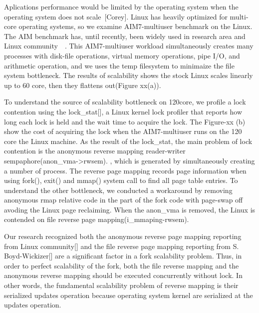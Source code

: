 Aplications performance would be limited by the operating system when the
operating system does not scale~\cite{Clements15SCR}[Corey].
Linux has heavily optimized for multi-core operating systems, so we examine
AIM7-multiuser benchmark on the Linux.
The AIM benchmark has, until recently, been widely used in research area
and Linux community~\cite{Bueso2015STP}~\cite{Bueso2014MCS}.
This AIM7-multiuser workload simultaneously creates many processes with
disk-file operations, virtual memory operations, pipe I/O, and arithmetic
operation, and we uses the temp filesystem to minimaize the file system
bottleneck.
The results of scalability shows the stock Linux scales linearly up to 60 core,
then they flattens out(Figure xx(a)).


To understand the source of scalability bottleneck on 120core, we profile a lock
contention using the lock\_stat[], a Linux kernel lock profiler that reports how
long each lock is held and the wait time to acquire the lock.
The Figure-xx (b) show the cost of acquiring the lock when the AIM7-multiuser
runs on the 120 core the Linux machine.
As the result of the lock\_stat, the main problem of lock contention is the
anonymous reverse mapping reader-writer sempaphore(anon\_vma->rwsem).
, which is generated by simultaneously creating a number of process.
The reverse page mapping records page information when using fork(), exit() and
mmap() system call to find all page table entries.
To understand the other bottleneck, we conducted a workaround by removing
anonymous rmap relative code in the part of the fork code with page-swap off
avoding the Linux page reclaiming.
When the anon\_vma is removed, the Linux is contended on file reverse page
mapping(i\_mmaping-rwsem).


Our research recognized both the anonymous reverse page mapping
reporting from Linux community[] and the file reverse page mapping reporting from S.
Boyd-Wickizer[] are a significant factor in a fork scalability problem.
Thus, in order to perfect scalability of the fork, both the
file reverse mapping and the anonymous reverse mapping should be executed
concurrently without lock.
In other words, the fundamental scalability problem of reverse mapping is their
serialized updates operation because operating system kernel are serialized at
the updates operation.

